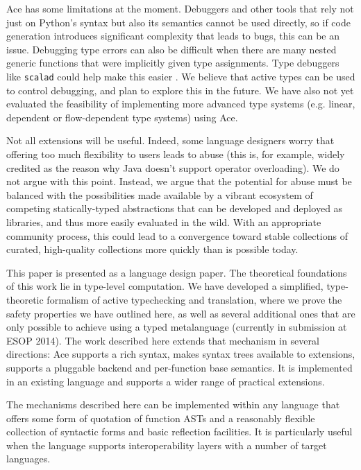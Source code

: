 \documentclass[9pt,preprint]{sigplanconf}
\begin{document}
Ace has some limitations at the moment. Debuggers and other tools that rely not just on Python's syntax but also its semantics cannot be used directly, so if code generation introduces significant complexity that leads to bugs, this can be an issue. Debugging type errors can also be difficult when there are many nested generic functions that were implicitly given type assignments. Type debuggers like \verb|scalad| could help make this easier \cite{scalad}. We believe that active types can be used to control debugging, and plan to explore this in the future. We have also not yet evaluated the feasibility of implementing more advanced type systems (e.g. linear, dependent or flow-dependent type systems) using Ace.

Not all extensions will be useful. Indeed, some language designers worry that offering too much flexibility to users leads to abuse (this is, for example, widely credited as the reason why Java doesn't support operator overloading). We do not argue with this point. Instead, we argue that the potential for abuse must be balanced with the possibilities made available by a vibrant ecosystem of competing statically-typed abstractions that can be developed and deployed as libraries, and thus more easily evaluated in the wild. With an appropriate community process, this could lead to a convergence toward stable collections of curated, high-quality collections more quickly than is possible today. %
 
This paper is presented as a language design paper. The theoretical foundations of this work lie in type-level computation. We have developed a simplified, type-theoretic formalism of active typechecking and translation, where we prove the safety properties we have outlined here, as well as several additional ones that are only possible to achieve using a typed metalanguage (currently in submission at ESOP 2014). The work described here  extends that mechanism in several directions: Ace supports a rich syntax, makes syntax trees available to extensions, supports a pluggable backend and per-function base semantics. It is implemented in an existing language and supports a wider range of practical extensions. 

The mechanisms described here can be implemented within any language that offers some form of quotation of function ASTs and a reasonably flexible collection of syntactic forms and basic reflection facilities. It is particularly useful when the language supports interoperability layers with a number of target languages. 
\end{document}
